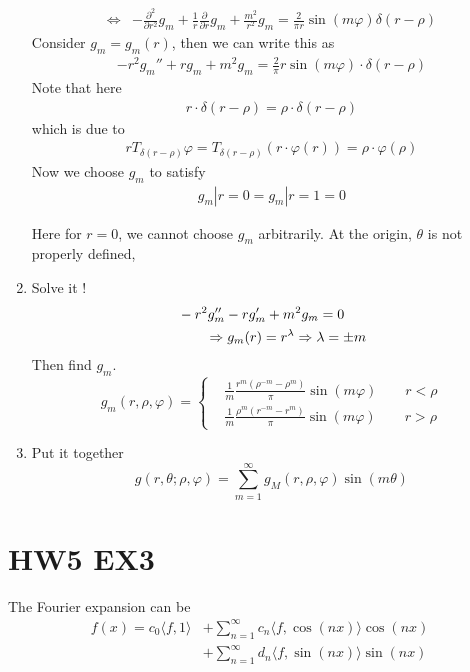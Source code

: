 \documentclass{article}
\numberwithin{equation}{section}
\newcommand{\<}{\langle}
\begin{document}
\begin{enumerate}[1)]
\begin{align}
 	\Leftrightarrow & - \frac{\partial^2}{\partial r^2} g_m + \frac{1}{r} \frac{\partial}{\partial r} g_m + \frac{m^2}{r^2} g_m = \frac{2 }{\pi r} \sin(m \varphi) \delta(r - \rho) 
\end{align} 
Consider $g_m = g_m(r)$, then we can write this as 
\begin{align}
	-r^2 g_m'' + r g_m + m ^2 g_m = \frac{2 }{\pi} r \sin(m \varphi)\cdot \delta(r - \rho)
\end{align}
Note that here
\begin{align*}
	r\cdot \delta(r- \rho) = \rho\cdot \delta( r - \rho)
\end{align*}
which is due to
\begin{align}
	r T_{\delta(r- \rho)} \varphi = T_{\delta(r- \rho)} (r \cdot \varphi(r)) = \rho\cdot \varphi(\rho)
\end{align}
Now we choose $g_m$ to satisfy
\begin{align*}
	g_m|{r = 0} = g_m|{r=1} = 0
\end{align*}
\begin{tcolorbox}
Here for $r=0$, we cannot choose $g_m$ arbitrarily. At the origin, $\theta$ is not properly defined, 
\end{tcolorbox}
\item Solve it !
\begin{align}
	&-r^2g_m''-rg_m'+m^2g_m = 0 \notag
	\\&\qquad\Rightarrow g_m(r) = r^\lambda \Rightarrow \lambda = \pm m 
\end{align}
Then find $g_m$.
\begin{equation}g_m(r, \rho, \varphi) = \left\{
\begin{aligned}
	&\frac{1}{m}\frac{r^m(\rho^{-m} - \rho^m)}{\pi} \sin(m \varphi) \qquad r < \rho\\
	&\frac{1}{m}\frac{\rho^m(r^{-m} - r^m)}{\pi} \sin(m \varphi) \qquad r > \rho
	\end{aligned}
	\right.
\end{equation}
\item Put it together
\begin{equation}
	g(r,\theta; \rho, \varphi) = \sum_{m=1}^\infty g_M(r, \rho, \varphi) \sin(m \theta)
\end{equation}
\end{enumerate}
\section{HW5 EX3}
The Fourier expansion can be 
\begin{align}
	f(x)  = c_0 \langle f, 1 \rangle &+ \sum_{n=1}^\infty c_n \langle f, \cos(nx) \rangle \cos(nx) \\&+
	\sum_{n=1}^{\infty}d_n \langle f, \sin(nx) \rangle \sin(nx)
\end{align}
\end{document}
